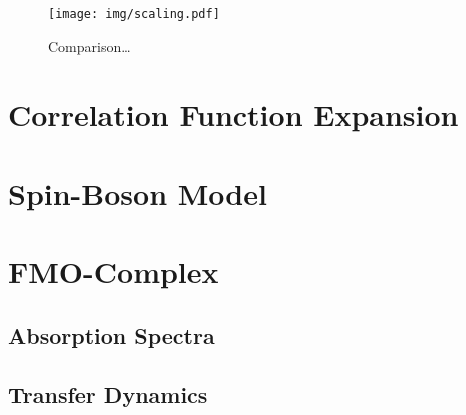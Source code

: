 \begin{figure}
  \centering
  \texttt{[image: img/scaling.pdf]}
  \caption{Comparison\dots}
  \label{fig:num.scaling}
\end{figure}


\section{Correlation Function Expansion}
\label{sec:num.expansion}



\section{Spin-Boson Model}
\label{sec:num.spin_boson}


\section{FMO-Complex}
\label{sec:num.fmo}


\subsection{Absorption Spectra}
\label{sub:num.fmo.absorption}

\subsection{Transfer Dynamics}
\label{sub:num.fmo.dynamics}

\cite{PlMGr86_casimir}
